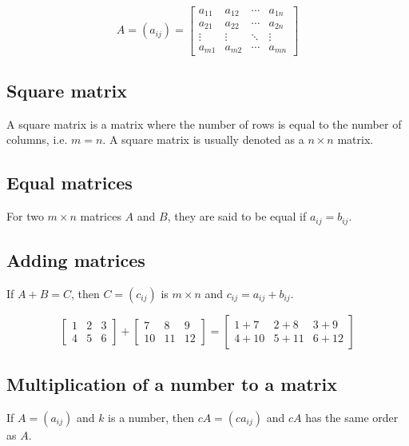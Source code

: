 \documentclass[11pt]{article}
\begin{document}
\begin{displaymath}
A = (a_{ij}) = \begin{bmatrix}
a_{11} & a_{12} & \cdots & a_{1n} \\
a_{21} & a_{22} & \cdots & a_{2n} \\
\vdots & \vdots & \ddots & \vdots \\
a_{m1} & a_{m2} & \cdots & a_{mn}
\end{bmatrix}
\end{displaymath}

\subsection{Square matrix}
\label{sec:orgdc075a6}
A square matrix is a matrix where the number of rows is equal to the number of columns, i.e. \(m = n\). A square matrix is usually denoted as a \(n \times n\) matrix.

\subsection{Equal matrices}
\label{sec:org5a57cac}
For two \(m \times n\) matrices \(A\) and \(B\), they are said to be equal if \(a_{ij} = b_{ij}\).

\subsection{Adding matrices}
\label{sec:org0207064}
If \(A + B = C\), then \(C = (c_{ij})\) is \(m \times n\) and \(c_{ij} = a_{ij} + b_{ij}\).

\begin{displaymath}
\begin{bmatrix}
1 & 2 & 3 \\
4 & 5 & 6
\end{bmatrix} + \begin{bmatrix}
7 & 8 & 9 \\
10 & 11 & 12
\end{bmatrix} = \begin{bmatrix}
1 + 7 & 2 + 8 & 3 + 9 \\
4 + 10 & 5 + 11 & 6 + 12
\end{bmatrix}
\end{displaymath}

\subsection{Multiplication of a number to a matrix}
\label{sec:orgb415731}
If \(A = (a_{ij})\) and \(k\) is a number, then \(cA = (ca_{ij})\) and \(cA\) has the same order as \(A\).
\end{document}
